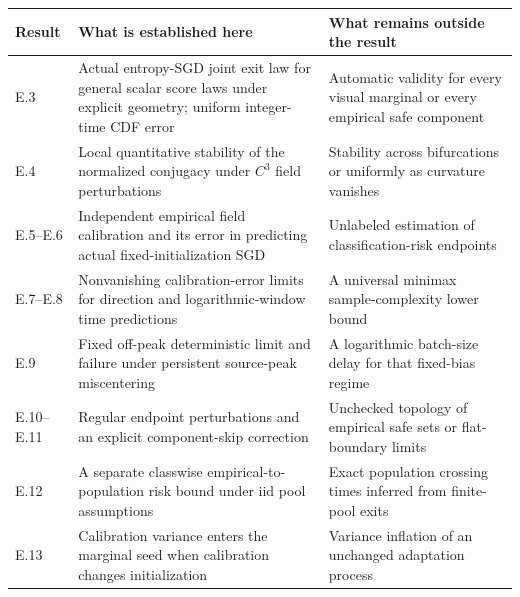 {\def\LTcaptype{table} %
\begin{longtable}[]{@{}
  >{\raggedright\arraybackslash}p{}
  >{\raggedright\arraybackslash}p{}
  >{\raggedright\arraybackslash}p{}@{}}
\toprule\noalign{}
\begin{minipage}[b]{\linewidth}\raggedright
Result
\end{minipage} & \begin{minipage}[b]{\linewidth}\raggedright
What is established here
\end{minipage} & \begin{minipage}[b]{\linewidth}\raggedright
What remains outside the result
\end{minipage} \\
\midrule\noalign{}
\endhead
\bottomrule\noalign{}
\endlastfoot
E.3 & Actual entropy-SGD joint exit law for general scalar score laws
under explicit geometry; uniform integer-time CDF error & Automatic
validity for every visual marginal or every empirical safe component \\
E.4 & Local quantitative stability of the normalized conjugacy under
\(C^3\) field perturbations & Stability across bifurcations or uniformly
as curvature vanishes \\
E.5--E.6 & Independent empirical field calibration and its error in
predicting actual fixed-initialization SGD & Unlabeled estimation of
classification-risk endpoints \\
E.7--E.8 & Nonvanishing calibration-error limits for direction and
logarithmic-window time predictions & A universal minimax
sample-complexity lower bound \\
E.9 & Fixed off-peak deterministic limit and failure under persistent
source-peak miscentering & A logarithmic batch-size delay for that
fixed-bias regime \\
E.10--E.11 & Regular endpoint perturbations and an explicit
component-skip correction & Unchecked topology of empirical safe sets or
flat-boundary limits \\
E.12 & A separate classwise empirical-to-population risk bound under iid
pool assumptions & Exact population crossing times inferred from
finite-pool exits \\
E.13 & Calibration variance enters the marginal seed when calibration
changes initialization & Variance inflation of an unchanged adaptation
process \\
\end{longtable}
}

